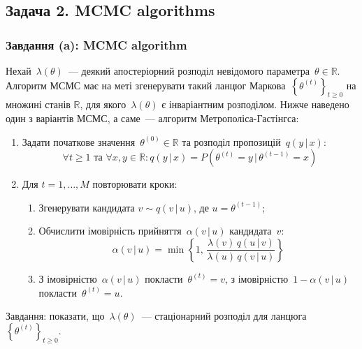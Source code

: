 \subsection*{Задача 2. MCMC algorithms}
\setcounter{subsection}{2}
\setcounter{equation}{0}

\subsubsection*{Завдання (a): MCMC algorithm}

Нехай~$\lambda(\theta)$~--- деякий апостеріорний розподіл невідомого параметра~$\theta \in \mathbb{R}$. Алгоритм МСМС має на меті згенерувати такий ланцюг Маркова~$\left\{ \theta^{(t)} \right\}_{t \geqslant 0}$ на множині станів $\mathbb{R}$, для якого~$\lambda(\theta)$ є інваріантним розподілом. Нижче наведено один з варіантів МСМС, а саме~--- алгоритм Метрополіса-Гастінгса:
\begin{enumerate}
    \item Задати початкове значення~$\theta^{(0)} \in \mathbb{R}$ та розподіл пропозицій~$q(y\, |\, x):$
    \begin{equation}
        \forall t \geqslant 1 \text{ та } \forall x,y \in \mathbb{R}: q(y\, |\, x) = P\left( \theta^{(t)} = y\, |\, \theta^{(t-1)} = x \right)
    \end{equation}    
    \item Для $t=1,\ldots,M$ повторювати кроки:
    \begin{enumerate}
        \item Згенерувати кандидата $v \sim q(v\, |\, u)$, де $u = \theta^{(t-1)}$;
        \item Обчислити імовірність прийняття~$\alpha(v\, |\, u)$ кандидата~$v:$
        \begin{equation} 
            \alpha(v\, |\, u) = \min\left\{ 
                1,\, \frac{\lambda(v)\,q(u\, |\, v)}{\lambda(u)\,q(v\, |\, u)} 
            \right\}
        \end{equation}
        \item З імовірністю~$\alpha(v\, |\, u)$ покласти~$\theta^{(t)} = v$, з імовірністю~$1-\alpha(v\, |\, u)$ покласти~$\theta^{(t)} = u$.
    \end{enumerate}
\end{enumerate}

Завдання: показати, що~$\lambda(\theta)$~--- стаціонарний розподіл для ланцюга~$\left\{ \theta^{(t)} \right\}_{t \geqslant 0}$.

